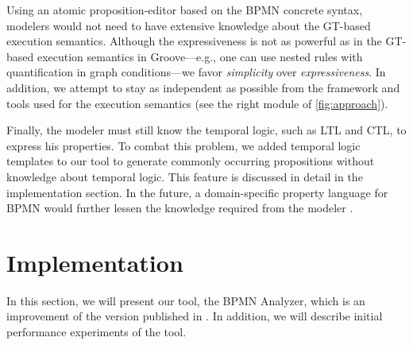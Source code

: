\documentclass{lmcs} %
\begin{document}

Using an atomic proposition-editor based on the BPMN concrete syntax, modelers would not need to have extensive knowledge about the GT-based execution semantics. 
Although the expressiveness is not as powerful as in the GT-based execution semantics in Groove---e.g., one can use nested rules with quantification in graph conditions---we favor \textit{simplicity} over \textit{expressiveness}.
In addition, we attempt to stay as independent as possible from the framework and tools used for the execution semantics (see the right module of \autoref{fig:approach}). %

Finally, the modeler must still know the temporal logic, such as LTL and CTL, to express his properties.
To combat this problem, we added temporal logic templates to our tool to generate commonly occurring propositions without knowledge about temporal logic.
This feature is discussed in detail in the implementation section.
In the future, a domain-specific property language for BPMN would further lessen the knowledge required from the modeler \cite{meyersProMoBoxFrameworkGenerating2014}.

\section{Implementation} \label{sec:impl}
In this section, we will present our tool, the BPMN Analyzer, which is an improvement of the version published in \cite{krauterFormalizationAnalysisBPMN2023}.
In addition, we will describe initial performance experiments of the tool.
\end{document}
